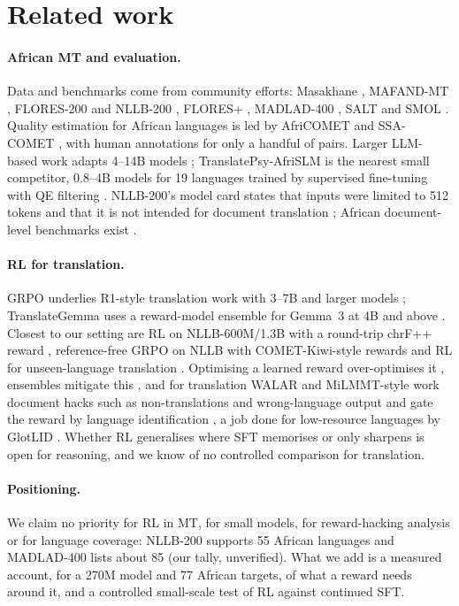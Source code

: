 \section{Related work}
\paragraph{African MT and evaluation.} Data and benchmarks come from community efforts: Masakhane \citep{nekoto2020participatory}, MAFAND-MT \citep{adelani2022mafand}, FLORES-200 and NLLB-200 \citep{goyal2022flores101,nllb2022nllb}, FLORES+ \citep{oldi2025floresplus}, MADLAD-400 \citep{kudugunta2023madlad}, SALT \citep{akera2022salt} and SMOL \citep{caswell2025smol}. Quality estimation for African languages is led by AfriCOMET \citep{wang2024africomet} and SSA-COMET \citep{li2025ssacomet}, with human annotations for only a handful of pairs. Larger LLM-based work adapts 4--14B models \citep{yu2026afriquellm,akera2025sunflower}; TranslatePsy-AfriSLM is the nearest small competitor, 0.8--4B models for 19 languages trained by supervised fine-tuning with QE filtering \citep{gritta2026translatepsy}. NLLB-200's model card states that inputs were limited to 512 tokens and that it is not intended for document translation \citep{nllb200_card}; African document-level benchmarks exist \citep{alabi2025afridocmt,abdulmumin2026afriscience}.
\paragraph{RL for translation.} GRPO \citep{shao2024deepseekmath} underlies R1-style translation work with 3--7B and larger models \citep{feng2025mtr1zero,cheng2025seedx,zheng2025hunyuanmt}; TranslateGemma uses a reward-model ensemble for Gemma~3 at 4B and above \citep{finkelstein2026translategemma}. Closest to our setting are RL on NLLB-600M/1.3B with a round-trip chrF++ reward \citep{attia2026roundtrip}, reference-free GRPO on NLLB with COMET-Kiwi-style rewards \citep{garciaestrada2026reffree} and RL for unseen-language translation \citep{hu2026rlunseen}. Optimising a learned reward over-optimises it \citep{gao2023scaling,krakovna2020specification}, ensembles mitigate this \citep{coste2024ensembles}, and for translation WALAR and MiLMMT-style work document hacks such as non-translations and wrong-language output and gate the reward by language identification \citep{liu2026walar,han2026milmmtrl}, a job done for low-resource languages by GlotLID \citep{kargaran2023glotlid}. Whether RL generalises where SFT memorises \citep{chu2025sft} or only sharpens \citep{yue2025doesrl} is open for reasoning, and we know of no controlled comparison for translation.
\paragraph{Positioning.} We claim no priority for RL in MT, for small models, for reward-hacking analysis or for language coverage: NLLB-200 supports 55 African languages and MADLAD-400 lists about 85 \citep{nllb2022nllb,kudugunta2023madlad} (our tally, unverified). What we add is a measured account, for a 270M model and 77 African targets, of what a reward needs around it, and a controlled small-scale test of RL against continued SFT.
